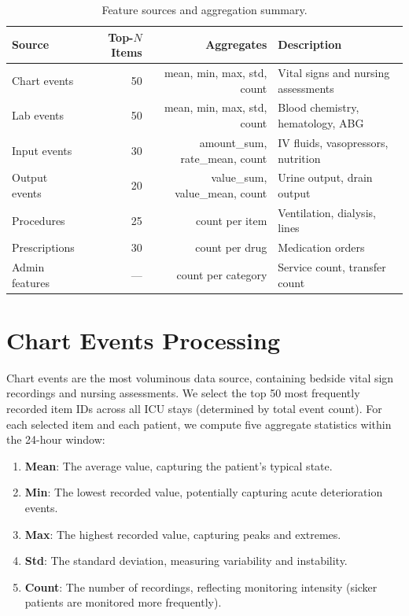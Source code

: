 \documentclass[11pt,a4paper]{report}
\begin{document}
\begin{table}[H]
\centering
\caption{Feature sources and aggregation summary.}
\label{tab:features}
\begin{tabular}{lrrp{6cm}}
\toprule
\textbf{Source} & \textbf{Top-$N$ Items} & \textbf{Aggregates} & \textbf{Description} \\
\midrule
Chart events & 50 & mean, min, max, std, count & Vital signs and nursing assessments \\
Lab events & 50 & mean, min, max, std, count & Blood chemistry, hematology, ABG \\
Input events & 30 & amount\_sum, rate\_mean, count & IV fluids, vasopressors, nutrition \\
Output events & 20 & value\_sum, value\_mean, count & Urine output, drain output \\
Procedures & 25 & count per item & Ventilation, dialysis, lines \\
Prescriptions & 30 & count per drug & Medication orders \\
Admin features & --- & count per category & Service count, transfer count \\
\bottomrule
\end{tabular}
\end{table}

\section{Chart Events Processing}

Chart events are the most voluminous data source, containing bedside vital sign recordings and nursing assessments. We select the top 50 most frequently recorded item IDs across all ICU stays (determined by total event count). For each selected item and each patient, we compute five aggregate statistics within the 24-hour window:

\begin{enumerate}[leftmargin=2em]
\item \textbf{Mean}: The average value, capturing the patient's typical state.
\item \textbf{Min}: The lowest recorded value, potentially capturing acute deterioration events.
\item \textbf{Max}: The highest recorded value, capturing peaks and extremes.
\item \textbf{Std}: The standard deviation, measuring variability and instability.
\item \textbf{Count}: The number of recordings, reflecting monitoring intensity (sicker patients are monitored more frequently).
\end{enumerate}
\end{document}
